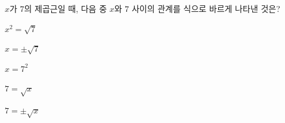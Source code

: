 $x$가 $7$의 제곱근일 때, 다음 중 $x$와 $7$ 사이의 관계를 식으로 바르게 나타낸 것은?
\begin{choices32}{\rule[-3ex]{0pt}{8ex}$x^2=\sqrt{7}$}{\rule[-3ex]{0pt}{8ex}$x=\pm\sqrt{7}$}{\rule[-3ex]{0pt}{8ex}$x=7^2$}{\rule[-3ex]{0pt}{8ex}$7=\sqrt{x}$}{\rule[-3ex]{0pt}{8ex}$7=\pm\sqrt{x}$}\end{choices32}
